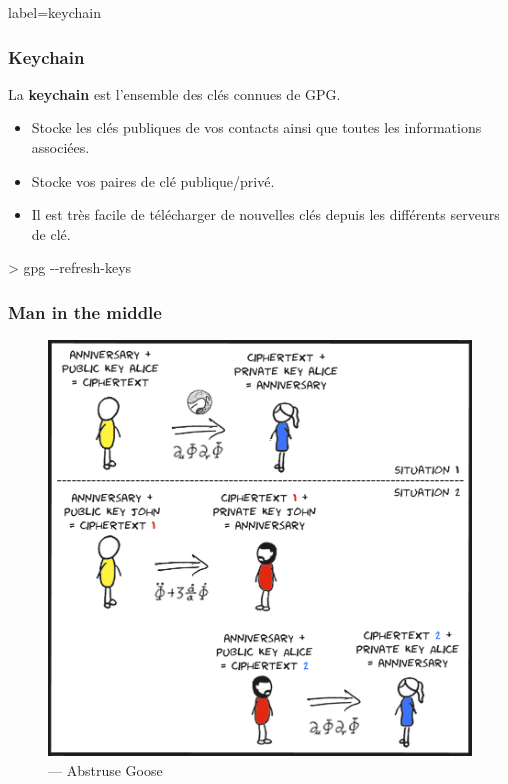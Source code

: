 \documentclass{beamer}
\begin{document}
        \begin{frame}{label=keychain}
            \frametitle{Keychain}
            La \textbf{keychain} est l'ensemble des clés connues de GPG.
            \begin{center}
                \begin{itemize}
                    \item Stocke les clés publiques de vos contacts ainsi que toutes les informations associées.
                    \item Stocke vos paires de clé publique/privé.
                    \item Il est très facile de télécharger de nouvelles clés depuis les différents serveurs de clé.
                \end{itemize}
                \begin{tcolorbox}[colback=green!5,colframe=green!40!black,title=Pour mettre à jour la keyring]
                    > gpg -{}-refresh-keys
                \end{tcolorbox}
            \end{center}
        \end{frame}
        \begin{frame}
            \frametitle{Man in the middle}
            \begin{center}
                \begin{figure}
                    \includegraphics[scale=0.2]{img/mitm.png}
                    \caption{\cc --- Abstruse Goose}
                \end{figure}
            \end{center}
        \end{frame}
\end{document}
